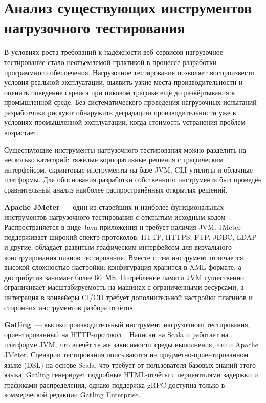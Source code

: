 \section{Анализ существующих инструментов нагрузочного тестирования}

В условиях роста требований к надёжности веб-сервисов нагрузочное тестирование
стало неотъемлемой практикой в процессе разработки программного обеспечения.
Нагрузочное тестирование позволяет воспроизвести условия реальной эксплуатации,
выявить узкие места производительности и оценить поведение сервиса при пиковом
трафике ещё до развёртывания в промышленной среде.
Без систематического проведения нагрузочных испытаний разработчики рискуют
обнаружить деградацию производительности уже в условиях промышленной эксплуатации,
когда стоимость устранения проблем возрастает.

Существующие инструменты нагрузочного тестирования можно разделить на несколько
категорий: тяжёлые корпоративные решения с графическим интерфейсом,
скриптовые инструменты на базе JVM, CLI-утилиты и облачные платформы.
Для обоснования разработки собственного инструмента был проведён сравнительный
анализ наиболее распространённых открытых решений.

\textbf{Apache JMeter}~--- один из старейших и наиболее функциональных инструментов
нагрузочного тестирования с открытым исходным кодом~\cite{jmeter}.
Распространяется в виде Java-приложения и требует наличия JVM.
JMeter поддерживает широкий спектр протоколов: HTTP, HTTPS, FTP, JDBC, LDAP и другие,
обладает развитым графическим интерфейсом для визуального конструирования
планов тестирования.
Вместе с тем инструмент отличается высокой сложностью настройки: конфигурация
хранится в XML-формате, а дистрибутив занимает более 60~МБ.
Потребление памяти JVM существенно ограничивает масштабируемость
на машинах с ограниченными ресурсами, а интеграция в конвейеры CI/CD требует
дополнительной настройки плагинов и сторонних инструментов разбора отчётов.

\textbf{Gatling}~--- высокопроизводительный инструмент нагрузочного тестирования,
ориентированный на HTTP-протокол~\cite{gatling}.
Написан на Scala и работает на платформе JVM, что влечёт те же зависимости
среды выполнения, что и Apache JMeter.
Сценарии тестирования описываются на предметно-ориентированном языке (DSL)
на основе Scala, что требует от пользователя базовых знаний этого языка.
Gatling генерирует подробные HTML-отчёты с перцентилями задержки и графиками
распределения, однако поддержка gRPC доступна только в коммерческой редакции
Gatling Enterprise.

